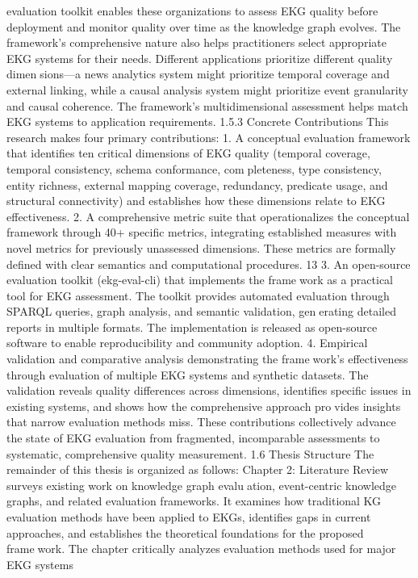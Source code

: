 evaluation toolkit enables these organizations to assess EKG quality before deployment
and monitor quality over time as the knowledge graph evolves.
The framework’s comprehensive nature also helps practitioners select appropriate
EKG systems for their needs. Different applications prioritize different quality dimensions—a news analytics system might prioritize temporal coverage and external linking,
while a causal analysis system might prioritize event granularity and causal coherence.
The framework’s multidimensional assessment helps match EKG systems to application
requirements.
1.5.3 Concrete Contributions
This research makes four primary contributions:
1. A conceptual evaluation framework that identifies ten critical dimensions of
EKG quality (temporal coverage, temporal consistency, schema conformance, completeness, type consistency, entity richness, external mapping coverage, redundancy,
predicate usage, and structural connectivity) and establishes how these dimensions
relate to EKG effectiveness.
2. A comprehensive metric suite that operationalizes the conceptual framework
through 40+ specific metrics, integrating established measures with novel metrics
for previously unassessed dimensions. These metrics are formally defined with clear
semantics and computational procedures.
13
3. An open-source evaluation toolkit (ekg-eval-cli) that implements the framework as a practical tool for EKG assessment. The toolkit provides automated
evaluation through SPARQL queries, graph analysis, and semantic validation, generating detailed reports in multiple formats. The implementation is released as
open-source software to enable reproducibility and community adoption.
4. Empirical validation and comparative analysis demonstrating the framework’s effectiveness through evaluation of multiple EKG systems and synthetic
datasets. The validation reveals quality differences across dimensions, identifies
specific issues in existing systems, and shows how the comprehensive approach provides insights that narrow evaluation methods miss.
These contributions collectively advance the state of EKG evaluation from fragmented,
incomparable assessments to systematic, comprehensive quality measurement.
1.6 Thesis Structure
The remainder of this thesis is organized as follows:
Chapter 2: Literature Review surveys existing work on knowledge graph evaluation, event-centric knowledge graphs, and related evaluation frameworks. It examines
how traditional KG evaluation methods have been applied to EKGs, identifies gaps in
current approaches, and establishes the theoretical foundations for the proposed framework. The chapter critically analyzes evaluation methods used for major EKG systems
